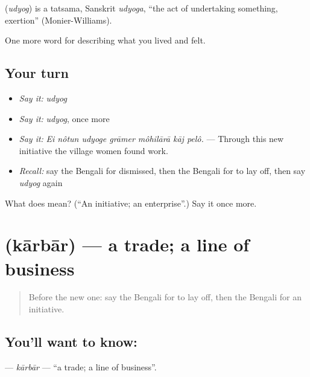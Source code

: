 \begin{cousinweb}
\textbf{} (\emph{udyog}) is a tatsama, Sanskrit \emph{udyoga}, \textquotedblleft{}the act of undertaking something, exertion\textquotedblright{} (Monier-Williams).
\end{cousinweb}

\begin{grammarlens}[title={What you've built}]
One more word for describing what you lived and felt.
\end{grammarlens}

\subsection*{Your turn}
\begin{itemize}
\raggedright
  \item \emph{Say it:} \emph{udyog}
  \item \emph{Say it:} \emph{udyog}, once more
  \item \emph{Say it:} \emph{Ei nôtun udyoge grāmer môhilārā kāj pelô.} — Through this new initiative the village women found work.
  \item \emph{Recall:} say the Bengali for dismissed, then the Bengali for to lay off, then say \emph{udyog} again
\end{itemize}

\begin{tcolorbox}[breakable,colback=teal!4,colframe=teal!35!black,title={Before you move on}]
What does  mean? (\textquotedblleft{}An initiative; an enterprise\textquotedblright{}.) Say it once more.
\end{tcolorbox}
\section[\texorpdfstring{\bn{কারবার} (kārbār)}{কারবার (kārbār)}]{ (kārbār) — a trade; a line of business}

\label{lesson:BN-C498-karbar}



\begin{quote}
Before the new one: say the Bengali for to lay off, then the Bengali for an initiative.
\end{quote}

\subsection*{You'll want to know: }
\textbf{} — \emph{kārbār} — \textquotedblleft{}a trade; a line of business\textquotedblright{}.

